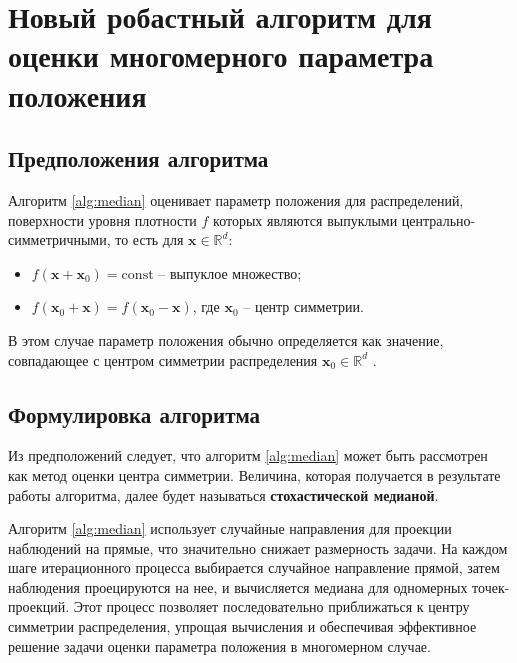 \documentclass[specialist,
substylefile = spbu.rtx,
               subf,href,colorlinks=true, 12pt]{disser}
\begin{document}
\chapter{Новый робастный алгоритм для оценки многомерного параметра положения}

\section{Предположения алгоритма}

Алгоритм \ref{alg:median} оценивает параметр положения для распределений, поверхности уровня плотности $f$ которых являются выпуклыми центрально-симметричными, то есть для $\mathbf{x}\in \mathbb{R}^d$:

     \begin{itemize}
         \item $f(\mathbf{x}+\mathbf{x}_0) =\mathrm{const}$ -- выпуклое множество;

         \item $f(\mathbf{x}_0+\mathbf{x})=f(\mathbf{x}_0-\mathbf{x})$, где $\mathbf{x}_0$ -- центр симметрии. 
     \end{itemize}
     
 В этом случае параметр положения обычно определяется как значение, совпадающее с центром симметрии распределения $\mathbf{x}_0\in \mathbb{R}^d$ \cite{modern_prob_stat}.
 
\section{Формулировка алгоритма}

Из предположений следует, что алгоритм \ref{alg:median} может быть рассмотрен как метод оценки центра симметрии. Величина, которая получается в результате работы алгоритма, далее будет называться \textbf{стохастической медианой}.

Алгоритм \ref{alg:median} использует случайные направления для проекции наблюдений на прямые, что значительно снижает размерность задачи. На каждом шаге итерационного процесса выбирается случайное направление прямой, затем наблюдения проецируются на нее, и вычисляется медиана для одномерных точек-проекций. Этот процесс позволяет последовательно приближаться к центру симметрии распределения, упрощая вычисления и обеспечивая эффективное решение задачи оценки параметра положения в многомерном случае.
\vspace{0.5ex}
\end{document}
